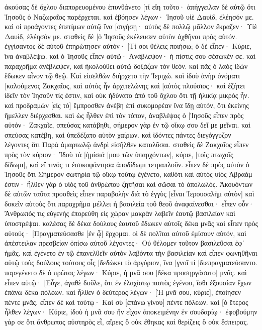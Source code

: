 ἀκούσας δὲ ὄχλου διαπορευομένου ἐπυνθάνετο [τί εἴη τοῦτο· 
ἀπήγγειλαν δὲ αὐτῷ ὅτι Ἰησοῦς ὁ Ναζωραῖος παρέρχεται. 
καὶ ἐβόησεν λέγων· Ἰησοῦ υἱὲ Δαυίδ, ἐλέησόν με. 
καὶ οἱ προάγοντες ἐπετίμων αὐτῷ ἵνα [σιγήσῃ· αὐτὸς δὲ πολλῷ μᾶλλον ἔκραζεν· Υἱὲ Δαυίδ, ἐλέησόν με. 
σταθεὶς δὲ [ὁ Ἰησοῦς ἐκέλευσεν αὐτὸν ἀχθῆναι πρὸς αὐτόν. ἐγγίσαντος δὲ αὐτοῦ ἐπηρώτησεν αὐτόν· 
[Τί σοι θέλεις ποιήσω; ὁ δὲ εἶπεν· Κύριε, ἵνα ἀναβλέψω. 
καὶ ὁ Ἰησοῦς εἶπεν αὐτῷ· Ἀνάβλεψον· ἡ πίστις σου σέσωκέν σε. 
καὶ παραχρῆμα ἀνέβλεψεν, καὶ ἠκολούθει αὐτῷ δοξάζων τὸν θεόν. καὶ πᾶς ὁ λαὸς ἰδὼν ἔδωκεν αἶνον τῷ θεῷ. 
Καὶ εἰσελθὼν διήρχετο τὴν Ἰεριχώ. 
καὶ ἰδοὺ ἀνὴρ ὀνόματι [καλούμενος Ζακχαῖος, καὶ αὐτὸς ἦν ἀρχιτελώνης καὶ [αὐτὸς πλούσιος· 
καὶ ἐζήτει ἰδεῖν τὸν Ἰησοῦν τίς ἐστιν, καὶ οὐκ ἠδύνατο ἀπὸ τοῦ ὄχλου ὅτι τῇ ἡλικίᾳ μικρὸς ἦν. 
καὶ προδραμὼν [εἰς τὸ] ἔμπροσθεν ἀνέβη ἐπὶ συκομορέαν ἵνα ἴδῃ αὐτόν, ὅτι ἐκείνης ἤμελλεν διέρχεσθαι. 
καὶ ὡς ἦλθεν ἐπὶ τὸν τόπον, ἀναβλέψας ὁ [Ἰησοῦς εἶπεν πρὸς αὐτόν· Ζακχαῖε, σπεύσας κατάβηθι, σήμερον γὰρ ἐν τῷ οἴκῳ σου δεῖ με μεῖναι. 
καὶ σπεύσας κατέβη, καὶ ὑπεδέξατο αὐτὸν χαίρων. 
καὶ ἰδόντες πάντες διεγόγγυζον λέγοντες ὅτι Παρὰ ἁμαρτωλῷ ἀνδρὶ εἰσῆλθεν καταλῦσαι. 
σταθεὶς δὲ Ζακχαῖος εἶπεν πρὸς τὸν κύριον· Ἰδοὺ τὰ [ἡμίσιά [μου τῶν ὑπαρχόντων], κύριε, [τοῖς πτωχοῖς δίδωμι], καὶ εἴ τινός τι ἐσυκοφάντησα ἀποδίδωμι τετραπλοῦν. 
εἶπεν δὲ πρὸς αὐτὸν ὁ Ἰησοῦς ὅτι Σήμερον σωτηρία τῷ οἴκῳ τούτῳ ἐγένετο, καθότι καὶ αὐτὸς υἱὸς Ἀβραάμ ἐστιν· 
ἦλθεν γὰρ ὁ υἱὸς τοῦ ἀνθρώπου ζητῆσαι καὶ σῶσαι τὸ ἀπολωλός. 
Ἀκουόντων δὲ αὐτῶν ταῦτα προσθεὶς εἶπεν παραβολὴν διὰ τὸ ἐγγὺς [εἶναι Ἰερουσαλὴμ αὐτὸν] καὶ δοκεῖν αὐτοὺς ὅτι παραχρῆμα μέλλει ἡ βασιλεία τοῦ θεοῦ ἀναφαίνεσθαι· 
εἶπεν οὖν· Ἄνθρωπός τις εὐγενὴς ἐπορεύθη εἰς χώραν μακρὰν λαβεῖν ἑαυτῷ βασιλείαν καὶ ὑποστρέψαι. 
καλέσας δὲ δέκα δούλους ἑαυτοῦ ἔδωκεν αὐτοῖς δέκα μνᾶς καὶ εἶπεν πρὸς αὐτούς· [Πραγματεύσασθε [ἐν ᾧ] ἔρχομαι. 
οἱ δὲ πολῖται αὐτοῦ ἐμίσουν αὐτόν, καὶ ἀπέστειλαν πρεσβείαν ὀπίσω αὐτοῦ λέγοντες· Οὐ θέλομεν τοῦτον βασιλεῦσαι ἐφ᾽ ἡμᾶς. 
καὶ ἐγένετο ἐν τῷ ἐπανελθεῖν αὐτὸν λαβόντα τὴν βασιλείαν καὶ εἶπεν φωνηθῆναι αὐτῷ τοὺς δούλους τούτους οἷς [δεδώκει τὸ ἀργύριον, ἵνα [γνοῖ τί [διεπραγματεύσαντο. 
παρεγένετο δὲ ὁ πρῶτος λέγων· Κύριε, ἡ μνᾶ σου [δέκα προσηργάσατο] μνᾶς. 
καὶ εἶπεν αὐτῷ· [Εὖγε, ἀγαθὲ δοῦλε, ὅτι ἐν ἐλαχίστῳ πιστὸς ἐγένου, ἴσθι ἐξουσίαν ἔχων ἐπάνω δέκα πόλεων. 
καὶ ἦλθεν ὁ δεύτερος λέγων· [Ἡ μνᾶ σου, κύριε], ἐποίησεν πέντε μνᾶς. 
εἶπεν δὲ καὶ τούτῳ· Καὶ σὺ [ἐπάνω γίνου] πέντε πόλεων. 
καὶ [ὁ ἕτερος ἦλθεν λέγων· Κύριε, ἰδοὺ ἡ μνᾶ σου ἣν εἶχον ἀποκειμένην ἐν σουδαρίῳ· 
ἐφοβούμην γάρ σε ὅτι ἄνθρωπος αὐστηρὸς εἶ, αἴρεις ὃ οὐκ ἔθηκας καὶ θερίζεις ὃ οὐκ ἔσπειρας. 
